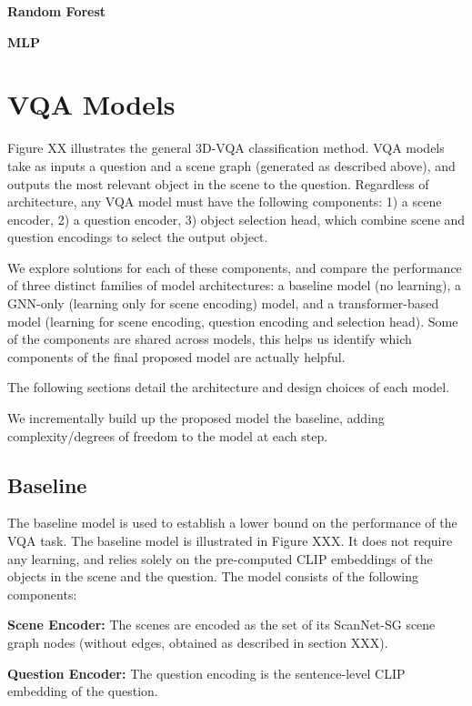 \bigskip
\noindent
\textbf{Random Forest}

\bigskip
\noindent
\textbf{MLP}






\newpage
\section{VQA Models}

Figure XX illustrates the general 3D-VQA classification method. VQA models take as inputs a question and a scene graph (generated as described above), and outputs the most relevant object in the scene to the question. Regardless of architecture, any VQA model must have the following components: 1) a scene encoder, 2) a question encoder, 3) object selection head, which combine scene and question encodings to select the output object.

We explore solutions for each of these components, and compare the performance of three distinct families of model architectures: a baseline model (no learning), a GNN-only (learning only for scene encoding) model, and a transformer-based model (learning for scene encoding, question encoding and selection head). Some of the components are shared across models, this helps us identify which components of the final proposed model are actually helpful.

The following sections detail the architecture and design choices of each model.

We incrementally build up the proposed model the baseline, adding complexity/degrees of freedom to the model at each step.

\subsection{Baseline}
The baseline model is used to establish a lower bound on the performance of the VQA task. The baseline model is illustrated in Figure XXX. It does not require any learning, and relies solely on the pre-computed CLIP embeddings of the objects in the scene and the question. The model consists of the following components:

\textbf{Scene Encoder:} The scenes are encoded as the set of its ScanNet-SG scene graph nodes (without edges, obtained as described in section XXX).

\textbf{Question Encoder:} The question encoding is the sentence-level CLIP embedding of the question.

